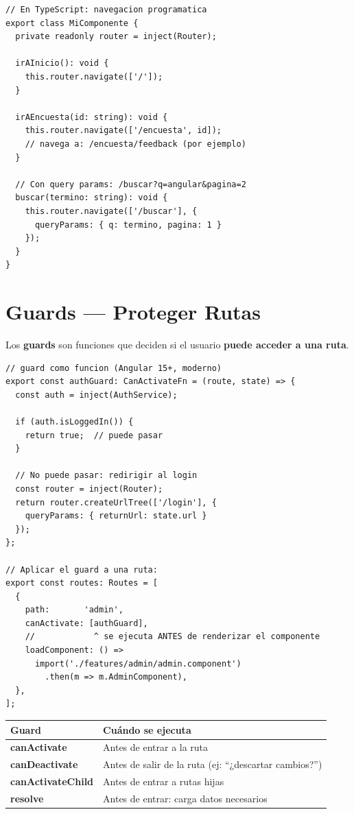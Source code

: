 \documentclass[12pt, a4paper]{article}
\begin{document}
\begin{lstlisting}
// En TypeScript: navegacion programatica
export class MiComponente {
  private readonly router = inject(Router);

  irAInicio(): void {
    this.router.navigate(['/']);
  }

  irAEncuesta(id: string): void {
    this.router.navigate(['/encuesta', id]);
    // navega a: /encuesta/feedback (por ejemplo)
  }

  // Con query params: /buscar?q=angular&pagina=2
  buscar(termino: string): void {
    this.router.navigate(['/buscar'], {
      queryParams: { q: termino, pagina: 1 }
    });
  }
}
\end{lstlisting}

\section{  Guards --- Proteger Rutas}

Los \textbf{guards} son funciones que deciden si el usuario \textbf{puede acceder a una ruta}.

\begin{lstlisting}
// guard como funcion (Angular 15+, moderno)
export const authGuard: CanActivateFn = (route, state) => {
  const auth = inject(AuthService);

  if (auth.isLoggedIn()) {
    return true;  // puede pasar
  }

  // No puede pasar: redirigir al login
  const router = inject(Router);
  return router.createUrlTree(['/login'], {
    queryParams: { returnUrl: state.url }
  });
};

// Aplicar el guard a una ruta:
export const routes: Routes = [
  {
    path:       'admin',
    canActivate: [authGuard],
    //            ^ se ejecuta ANTES de renderizar el componente
    loadComponent: () =>
      import('./features/admin/admin.component')
        .then(m => m.AdminComponent),
  },
];
\end{lstlisting}

\begin{center}
\renewcommand{\arraystretch}{1.8}
\begin{tabular}{>{\ttfamily\bfseries}p{3.5cm} p{8.5cm}}
\toprule
Guard & Cuándo se ejecuta \\
\midrule
canActivate & Antes de entrar a la ruta \\
canDeactivate & Antes de salir de la ruta (ej: ``¿descartar cambios?'') \\
canActivateChild & Antes de entrar a rutas hijas \\
resolve & Antes de entrar: carga datos necesarios \\
\bottomrule
\end{tabular}
\end{center}
\end{document}
